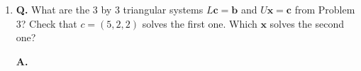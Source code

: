 \documentclass[main.tex]{subfiles}
\begin{document}
\begin{enumerate}
$$\begin{aligned}
\begin{array}{llll}
    1 & 3 & 6 & 11
    \end{array}\right] \\
    L[U c] &= \left[\begin{array}{llll}
    1 & 0 & 0 \\
    1 & 1 & 0 \\
    1 & 2 & 1
    \end{array}\right]\left[\begin{array}{lllll}
    1 & 1 & 1 & 5 \\
    0 & 1 & 2 & 2 \\
    0 & 0 & 1 & 2
    \end{array}\right] \\
    &= \left[\begin{array}{llll}
    1 & 1 & 1 & 5 \\
    1 & 2 & 3 & 7 \\
    1 & 3 & 6 & 11
    \end{array}\right]\\
    x+y+z=5+2 \quad y+2 z=2+1 \quad z=2 \quad & \text { gives } \quad x+3 y+6 z=11
    \end{aligned}
    $$
    
    \item [4.] \textbf{Q.} What are the 3 by 3 triangular systems $L \bm{c}=\bm{b}$ and $U\bm{x}=\bm{c}$ from Problem 3? Check that $c=(5,2,2)$ solves the first one. Which $\bm{x}$ solves the second one? 
    
    \textbf{A.} 
    

\end{enumerate}
\end{document}
